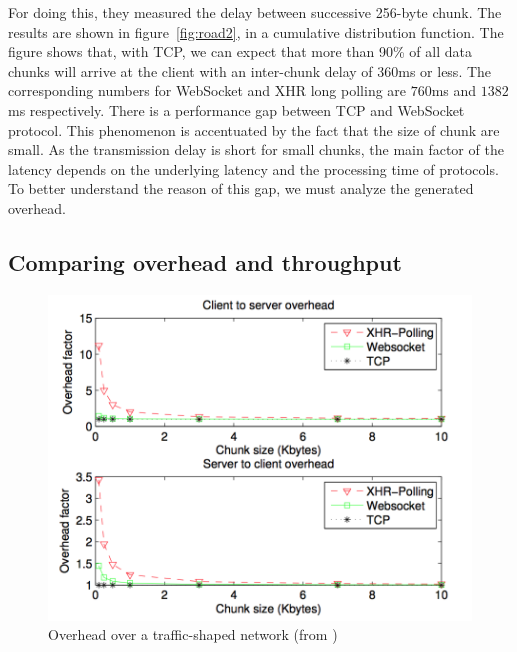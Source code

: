 \documentclass[journal,compsoc]{IEEEtran}
\newcommand{\ws}{WebSocket}
\begin{document}
For doing this, they measured the delay between successive 256-byte chunk.
The results are shown in figure~\ref{fig:road2}, in a cumulative distribution function.
The figure shows that, with TCP, we can expect that more than 90\% of all data chunks will arrive at the client with an inter-chunk delay of 360ms or less. The corresponding numbers for \ws{} and XHR long polling are $760$ms and $1382$ms respectively.
There is a performance gap between TCP and \ws{} protocol.
This phenomenon is accentuated by the fact that the size of chunk are small.
As the transmission delay is short for small chunks, the main factor of the latency depends on the underlying latency and the processing time of protocols.
To better understand the reason of this gap, we must analyze the generated overhead.

\subsection{Comparing overhead and throughput}

\begin{figure}[!ht]
    \centering
    \includegraphics[width=\linewidth]{road4.png}
    \caption{Overhead over a traffic-shaped network (from \cite{roadblock})}
    \label{fig:road4}
\end{figure}
\end{document}
